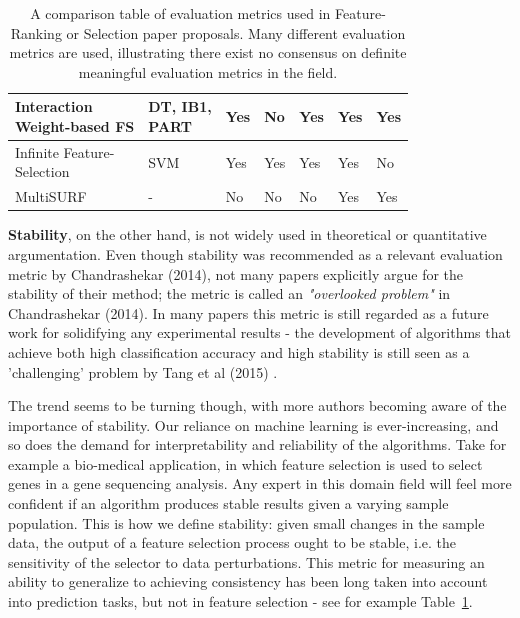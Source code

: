 \documentclass{article}
\begin{document}
\begin{table}[ht]
\begin{tabular}{| l | l | l | l | l | l | l |}
    \hline
    \makecell[tl]{Interaction \\Weight-based FS \citep{zeng_novel_2015}} & \makecell[tl]{DT, IB1,\\ PART}                   & Yes               & No                 & Yes                & Yes                & Yes                   \\
    \hline
    \makecell[tl]{Infinite Feature- \\Selection \citep{roffo_infinite_2015}}  & SVM                             & Yes               & Yes                & Yes                & Yes                & No                    \\
    \hline
    MultiSURF \citep{urbanowicz_relief-based_2018}                   &           -                      & No                & No                 & No                 & Yes                & Yes     \\
    \hline     
    \end{tabular}
    \caption{A comparison table of evaluation metrics used in Feature- Ranking or Selection paper proposals. Many different evaluation metrics are used, illustrating there exist no consensus on definite meaningful evaluation metrics in the field.}
    \label{table:evaluation-metrics-table}
\end{table}

\textbf{Stability}, on the other hand, is not widely used in theoretical or quantitative argumentation. Even though stability was recommended as a relevant evaluation metric by Chandrashekar (2014), not many papers explicitly argue for the stability of their method; the metric is called an \textit{"overlooked problem"} in Chandrashekar (2014). In many papers this metric is still regarded as a future work for solidifying any experimental results - the development of algorithms that achieve both high classification accuracy and high stability is still seen as a 'challenging' problem by Tang et al (2015) \citep{tang_feature_2014}.

The trend seems to be turning though, with more authors becoming aware of the importance of stability. Our reliance on machine learning is ever-increasing, and so does the demand for interpretability and reliability of the algorithms. Take for example a bio-medical application, in which feature selection is used to select genes in a gene sequencing analysis. Any expert in this domain field will feel more confident if an algorithm produces stable results given a varying sample population. This is how we define stability: given small changes in the sample data, the output of a feature selection process ought to be stable, i.e. the sensitivity of the selector to data perturbations. This metric for measuring an ability to generalize to achieving consistency has been long taken into account into prediction tasks, but not in feature selection - see for example Table~\ref{table:evaluation-metrics-table}.
\end{document}
